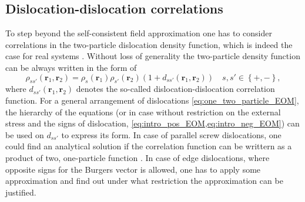 \subsection{Dislocation-dislocation correlations} \label{sec:disloc_sim_LDA}
To step beyond the self-consistent field approximation one has to consider correlations in the two-particle dislocation density function, which is indeed the case for real systems \cite{PhysRevB.64.224102}. Without loss of generality the two-particle density function can be always written in the form of
\begin{equation}
{\rho _{ss'}}\left( {{{\mathbf{r}}_1},{{\mathbf{r}}_2}} \right) = {\rho _s}\left( {{{\mathbf{r}}_1}} \right){\rho _{s'}}\left( {{{\mathbf{r}}_2}} \right)\left( {1 + {d_{ss'}}\left( {{{\mathbf{r}}_1},{{\mathbf{r}}_2}} \right)} \right)\quad s,s' \in \left\{ { + , - } \right\},
\end{equation}
where ${{d_{ss'}}\left( {{{\mathbf{r}}_1},{{\mathbf{r}}_2}} \right)}$ denotes the so-called dislocation-dislocation correlation function. For a general arrangement of dislocations \cref{eq:one_two_particle_EOM}, the hierarchy of the equations (or in case without restriction on the external stress and the signs of dislocation, \cref{eq:intro_pos_EOM,eq:intro_neg_EOM}) can be used on $d_{ss'}$ to express its form. In case of parallel screw dislocations, one could find an analytical solution if the correlation function can be writtern as a product of two, one-particle function \cite{doi:10.1177/1081286508092609,VINOGRADOV20083726}. In case of edge dislocations, where opposite signs for the Burgers vector is allowed, one has to apply some approximation and find out under what restriction the approximation can be justified.

